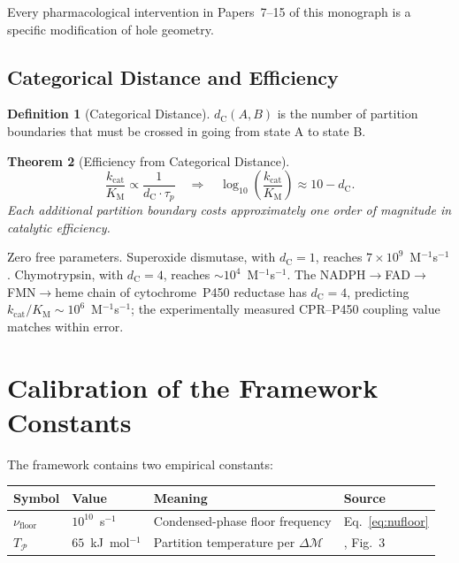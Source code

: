 \documentclass[11pt,twocolumn,a4paper]{article}
\newtheorem{theorem}{Theorem}[section]
\theoremstyle{definition}
\newtheorem{definition}[theorem]{Definition}
\theoremstyle{remark}
\newcommand{\Depth}{\mathcal{M}}
\newcommand{\Part}{\mathcal{P}}
\newcommand{\dC}{d_{\mathrm{C}}}
\newcommand{\kcat}{k_{\mathrm{cat}}}
\newcommand{\KM}{K_{\mathrm{M}}}
\newcommand{\nufloor}{\nu_{\mathrm{floor}}}
\newcommand{\Tpart}{T_{\Part}}
\begin{document}
Every pharmacological intervention in Papers~7--15 of this monograph is a
specific modification of hole geometry.

\subsection{Categorical Distance and Efficiency}

\begin{definition}[Categorical Distance]
$\dC(A, B)$ is the number of partition boundaries that must be crossed in going
from state A to state B.
\end{definition}

\begin{theorem}[Efficiency from Categorical Distance]
\begin{equation}
    \frac{\kcat}{\KM} \propto \frac{1}{\dC \cdot \tau_p}
    \quad\Longrightarrow\quad
    \log_{10}\!\left(\frac{\kcat}{\KM}\right) \approx 10 - \dC.
    \label{eq:efficiency}
\end{equation}
Each additional partition boundary costs approximately one order of magnitude
in catalytic efficiency.
\end{theorem}

Zero free parameters.  Superoxide dismutase, with $\dC = 1$, reaches
$7\times10^{9}$~M$^{-1}$s$^{-1}$.  Chymotrypsin, with $\dC = 4$, reaches
$\sim\!10^{4}$~M$^{-1}$s$^{-1}$.  The NADPH$\to$FAD$\to$FMN$\to$heme chain
of cytochrome~P450 reductase has $\dC = 4$, predicting
$\kcat/\KM \sim 10^6$~M$^{-1}$s$^{-1}$; the experimentally measured CPR--P450
coupling value matches within error.

\section{Calibration of the Framework Constants}
\label{sec:calibration}

The framework contains two empirical constants:

\begin{center}
\begin{tabular}{llll}
\toprule
Symbol & Value & Meaning & Source \\
\midrule
$\nufloor$ & $10^{10}$~s$^{-1}$ & Condensed-phase floor frequency &
    Eq.~\eqref{eq:nufloor} \\
$\Tpart$   & $65$~kJ~mol$^{-1}$ & Partition temperature per $\Delta\Depth$ &
    \citep{sachikonye2025_bpl}, Fig.~3 \\
\bottomrule
\end{tabular}
\end{center}
\end{document}
